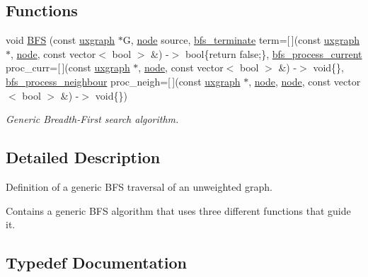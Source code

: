\subsection*{Functions}
\begin{DoxyCompactItemize}
\item 
void \hyperlink{namespacelgraph_1_1traversal_1_1bfs_ab806c790c2fdfd03a0bc0bb9d4186043}{B\+FS} (const \hyperlink{classlgraph_1_1utils_1_1uxgraph}{uxgraph} $\ast$G, \hyperlink{namespacelgraph_1_1utils_a7bd66ede3805ef121bc2835bd48de0cf}{node} source, \hyperlink{namespacelgraph_1_1traversal_1_1bfs_a2622d8419e685b0a28b9ad70ca6c1565}{bfs\+\_\+terminate} term=\mbox{[}$\,$\mbox{]}(const \hyperlink{classlgraph_1_1utils_1_1uxgraph}{uxgraph} $\ast$, \hyperlink{namespacelgraph_1_1utils_a7bd66ede3805ef121bc2835bd48de0cf}{node}, const vector$<$ bool $>$ \&) -\/$>$ bool\{return false;\}, \hyperlink{namespacelgraph_1_1traversal_1_1bfs_a5a37d7fee20d8b473826d3599ada96b7}{bfs\+\_\+process\+\_\+current} proc\+\_\+curr=\mbox{[}$\,$\mbox{]}(const \hyperlink{classlgraph_1_1utils_1_1uxgraph}{uxgraph} $\ast$, \hyperlink{namespacelgraph_1_1utils_a7bd66ede3805ef121bc2835bd48de0cf}{node}, const vector$<$ bool $>$ \&) -\/$>$ void\{\}, \hyperlink{namespacelgraph_1_1traversal_1_1bfs_ab8c86ff87736f713c845b61ac6a0a956}{bfs\+\_\+process\+\_\+neighbour} proc\+\_\+neigh=\mbox{[}$\,$\mbox{]}(const \hyperlink{classlgraph_1_1utils_1_1uxgraph}{uxgraph} $\ast$, \hyperlink{namespacelgraph_1_1utils_a7bd66ede3805ef121bc2835bd48de0cf}{node}, \hyperlink{namespacelgraph_1_1utils_a7bd66ede3805ef121bc2835bd48de0cf}{node}, const vector$<$ bool $>$ \&) -\/$>$ void\{\})
\begin{DoxyCompactList}\small\item\em Generic Breadth-\/\+First search algorithm. \end{DoxyCompactList}\end{DoxyCompactItemize}


\subsection{Detailed Description}
Definition of a generic B\+FS traversal of an unweighted graph. 

Contains a generic B\+FS algorithm that uses three different functions that guide it. 

\subsection{Typedef Documentation}
